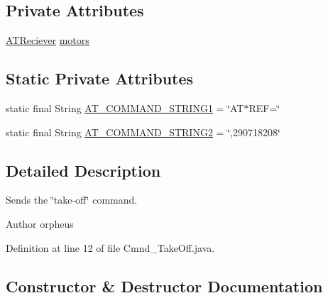 \subsection*{Private Attributes}
\begin{DoxyCompactItemize}
\item 
\hyperlink{class_drone_1_1_hardware_1_1_a_t_reciever}{A\+T\+Reciever} \hyperlink{class_drone_1_1_drone_commands_1_1_cmnd___take_off_a36070de41a3dc86f56df6a987050cf93}{motors}
\end{DoxyCompactItemize}
\subsection*{Static Private Attributes}
\begin{DoxyCompactItemize}
\item 
static final String \hyperlink{class_drone_1_1_drone_commands_1_1_cmnd___take_off_a81d9c1d947903cb7033f02d0fc50b29a}{A\+T\+\_\+\+C\+O\+M\+M\+A\+N\+D\+\_\+\+S\+T\+R\+I\+N\+G1} = \char`\"{}A\+T$\ast$R\+E\+F=\char`\"{}
\item 
static final String \hyperlink{class_drone_1_1_drone_commands_1_1_cmnd___take_off_a6a0828ac3a68db7162e571a9de31d14a}{A\+T\+\_\+\+C\+O\+M\+M\+A\+N\+D\+\_\+\+S\+T\+R\+I\+N\+G2} = \char`\"{},290718208\char`\"{}
\end{DoxyCompactItemize}


\subsection{Detailed Description}
Sends the \char`\"{}take-\/off\char`\"{} command. \begin{DoxyAuthor}{Author}
orpheus 
\end{DoxyAuthor}


Definition at line 12 of file Cmnd\+\_\+\+Take\+Off.\+java.



\subsection{Constructor \& Destructor Documentation}
\hypertarget{class_drone_1_1_drone_commands_1_1_cmnd___take_off_adc7675196bf02d255a5d0d099f359a54}{}
